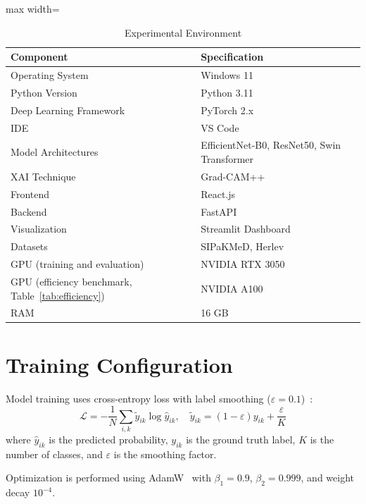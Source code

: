 \documentclass[conference]{IEEEtran}
\begin{document}
\begin{table}[t]
\centering
\caption{Experimental Environment}
\label{tab:environment}
\begin{adjustbox}{max width=\columnwidth}
\begin{tabular}{|l|l|}
\hline
\textbf{Component} & \textbf{Specification} \\ \hline
Operating System & Windows 11 \\ \hline
Python Version & Python 3.11 \\ \hline
Deep Learning Framework & PyTorch 2.x \\ \hline
IDE & VS Code  \\ \hline
Model Architectures & EfficientNet-B0, ResNet50, Swin Transformer \\ \hline
XAI Technique & Grad-CAM++ \\ \hline
Frontend & React.js \\ \hline
Backend & FastAPI \\ \hline
Visualization & Streamlit Dashboard \\ \hline
Datasets & SIPaKMeD, Herlev \\ \hline
GPU (training and evaluation) & NVIDIA RTX 3050 \\ \hline
GPU (efficiency benchmark, Table~\ref{tab:efficiency}) & NVIDIA A100 \\ \hline
RAM & 16 GB \\ \hline
\end{tabular}
\end{adjustbox}
\end{table}

\section{Training Configuration}
\label{sec:training}

Model training uses cross-entropy loss with label smoothing ($\varepsilon=0.1$)~\cite{szegedy2016rethinking}:
\begin{equation}
    \mathcal{L} =
    -\frac{1}{N}\sum_{i,k}\tilde{y}_{ik}\log \hat{y}_{ik}, \quad
    \tilde{y}_{ik} = (1 - \varepsilon)y_{ik} + \frac{\varepsilon}{K}
    \label{eq:loss}
\end{equation}
where $\hat{y}_{ik}$ is the predicted probability, $y_{ik}$ is the ground truth label, $K$ is the number of classes, and $\varepsilon$ is the smoothing factor.

Optimization is performed using AdamW~\cite{loshchilov2019adamw} with $\beta_1=0.9$, $\beta_2=0.999$, and weight decay $10^{-4}$.
\end{document}
